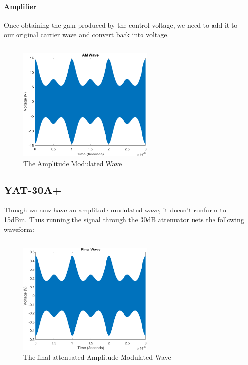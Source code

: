     \paragraph{Amplifier}
    
    Once obtaining the gain produced by the control voltage, we need to add it to our original carrier wave and convert back into voltage.
    \inputminted[breaklines]{Matlab}{./Code/VGASim2.m}
    

    \begin{figure}[H]
        \centering
        \includegraphics[width = 0.6\textwidth]{Images/AMWave.png}
        \caption{The Amplitude Modulated Wave}
        \label{fig:AM}
    \end{figure}

\newpage
\subsection{YAT-30A+}
    Though we now have an amplitude modulated wave, it doesn't conform to 15dBm. Thus running the signal through the 30dB attenuator nets the following waveform:
    \inputminted{Matlab}{./Code/FinalWave.m}
    \begin{figure}[H]
        \centering
        \includegraphics[width = 0.6\textwidth]{Images/FinalWave.png}
        \caption{The final attenuated Amplitude Modulated Wave}
        \label{fig:FinalAM}
    \end{figure}